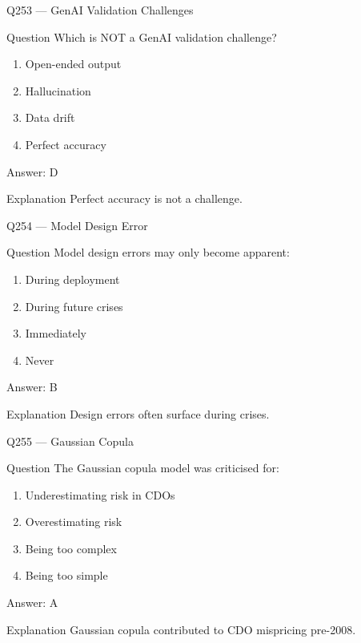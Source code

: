 \documentclass[aspectratio=169,8pt]{beamer}
\begin{document}
\begin{frame}{Q253 --- GenAI Validation Challenges}
\begin{block}{Question}
Which is NOT a GenAI validation challenge?
\begin{enumerate}
\item Open-ended output
\item Hallucination
\item Data drift
\item Perfect accuracy
\end{enumerate}
\end{block}
\begin{exampleblock}{Answer: D}\end{exampleblock}
\begin{block}{Explanation}
Perfect accuracy is not a challenge.
\end{block}
\end{frame}

\begin{frame}{Q254 --- Model Design Error}
\begin{block}{Question}
Model design errors may only become apparent:
\begin{enumerate}
\item During deployment
\item During future crises
\item Immediately
\item Never
\end{enumerate}
\end{block}
\begin{exampleblock}{Answer: B}\end{exampleblock}
\begin{block}{Explanation}
Design errors often surface during crises.
\end{block}
\end{frame}

\begin{frame}{Q255 --- Gaussian Copula}
\begin{block}{Question}
The Gaussian copula model was criticised for:
\begin{enumerate}
\item Underestimating risk in CDOs
\item Overestimating risk
\item Being too complex
\item Being too simple
\end{enumerate}
\end{block}
\begin{exampleblock}{Answer: A}\end{exampleblock}
\begin{block}{Explanation}
Gaussian copula contributed to CDO mispricing pre-2008.
\end{block}
\end{frame}
\end{document}
